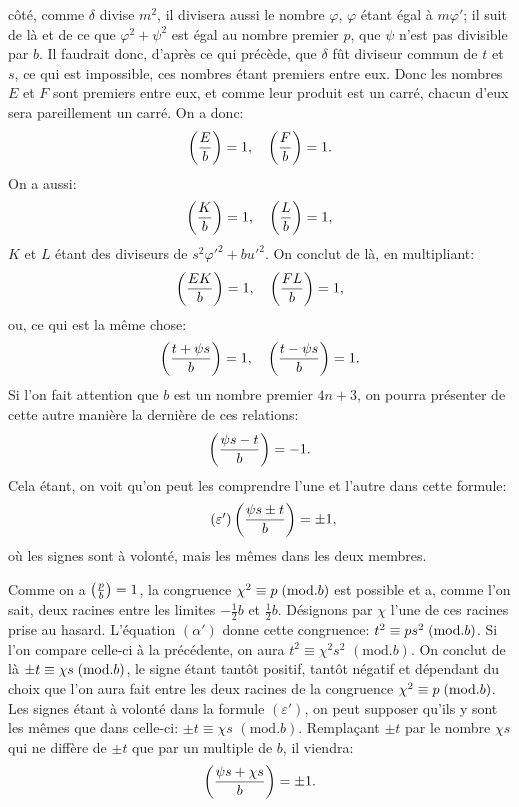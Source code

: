 \noindent
côté, comme $\delta$ divise $m^2$, il divisera aussi le nombre $\varphi$, $\varphi$ étant égal à $m\varphi'$;
il suit de là et de ce que $\varphi^2+\psi^2$ est égal au nombre premier $p$, que $\psi$ n'est
pas divisible par $b$. Il faudrait donc, d'après ce qui précède, que $\delta$ fût diviseur
commun de $t$ et $s$, ce qui est impossible, ces nombres étant premiers entre
eux. Donc les nombres $E$ et $F$ sont premiers entre eux, et comme leur produit
est un carré, chacun d'eux sera pareillement un carré. On a donc:
\[
\left(\frac{E}{b}\right)=1,\quad\left(\frac{F}{b}\right)=1.
\]
On a aussi:
\[
\left(\frac{K}{b}\right)=1,\quad\left(\frac{L}{b}\right)=1,
\]
$K$ et $L$ étant des diviseurs de $s^2\varphi'^2+bu'^2$. On conclut de là, en multipliant:
\[
\left(\frac{EK}{b}\right)=1,\quad\left(\frac{FL}{b}\right)=1,
\]
ou, ce qui est la même chose:
\[
\left(\frac{t+\psi s}{b}\right)=1,\quad\left(\frac{t-\psi s}{b}\right)=1.
\]
Si l'on fait attention que $b$ est un nombre premier $4n+3$, on pourra présenter
de cette autre manière la dernière de ces relations:
\[
\left(\frac{\psi s-t}{b}\right)=-1.
\]
Cela étant, on voit qu'on peut les comprendre l'une et l'autre dans cette formule:
\begin{equation*}\tag{$\varepsilon'$}
\left(\frac{\psi s\pm t}{b}\right)=\pm1,
\end{equation*}
où les signes sont à volonté, mais les mêmes dans les deux membres.
\par\indent
Comme on a $\left(\frac{p}{b}\right)=1$, la congruence $\chi^2\equiv p\;(\mathrm{mod}.b)$ est possible et
a, comme l'on sait, deux racines entre les limites $-\frac12b$ et $\frac12b$. Désignons par
$\chi$ l'une de ces racines prise au hasard. L'équation $(\alpha')$ donne cette congruence:
$t^2\equiv ps^2\;(\mathrm{mod}.b)$. Si l'on compare celle-ci à la précédente, on aura $t^2\equiv\chi^2s^2$
$(\mathrm{mod}.b)$. On conclut de là $\pm t\equiv\chi s\;(\mathrm{mod}.b)$, le signe étant tantôt positif,
tantôt négatif et dépendant du choix que l'on aura fait entre les deux racines
de la congruence $\chi^2\equiv p\;(\mathrm{mod}.b)$. Les signes étant à volonté dans la formule
$(\varepsilon')$, on peut supposer qu'ils y sont les mêmes que dans celle-ci: $\pm t\equiv\chi s$
$(\mathrm{mod}.b)$. Remplaçant $\pm t$ par le nombre $\chi s$ qui ne diffère de $\pm t$ que par un
multiple de $b$, il viendra:
\[
\left(\frac{\psi s+\chi s}{b}\right)=\pm1.
\]
